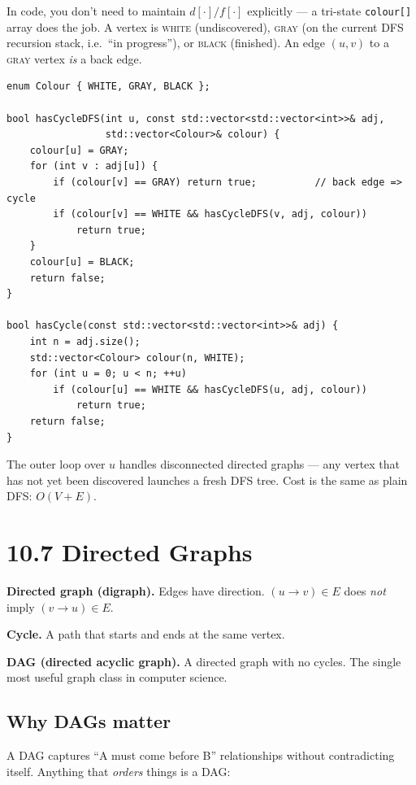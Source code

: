 \documentclass[11pt]{article}
\begin{document}
In code, you don't need to maintain $d[\cdot] / f[\cdot]$
explicitly --- a tri-state \texttt{colour[]} array does the job.
A vertex is \textsc{white} (undiscovered), \textsc{gray} (on the
current DFS recursion stack, i.e.\ ``in progress''), or
\textsc{black} (finished). An edge $(u, v)$ to a \textsc{gray}
vertex \emph{is} a back edge.

\begin{lstlisting}[basicstyle=\ttfamily\small,frame=single]
enum Colour { WHITE, GRAY, BLACK };

bool hasCycleDFS(int u, const std::vector<std::vector<int>>& adj,
                 std::vector<Colour>& colour) {
    colour[u] = GRAY;
    for (int v : adj[u]) {
        if (colour[v] == GRAY) return true;          // back edge => cycle
        if (colour[v] == WHITE && hasCycleDFS(v, adj, colour))
            return true;
    }
    colour[u] = BLACK;
    return false;
}

bool hasCycle(const std::vector<std::vector<int>>& adj) {
    int n = adj.size();
    std::vector<Colour> colour(n, WHITE);
    for (int u = 0; u < n; ++u)
        if (colour[u] == WHITE && hasCycleDFS(u, adj, colour))
            return true;
    return false;
}
\end{lstlisting}

The outer loop over $u$ handles disconnected directed graphs ---
any vertex that has not yet been discovered launches a fresh DFS
tree. Cost is the same as plain DFS: $O(V + E)$.

\section{10.7 Directed Graphs}

\begin{defnbox}
\textbf{Directed graph (digraph).} Edges have direction. $(u \to v) \in E$ does \emph{not} imply $(v \to u) \in E$.

\textbf{Cycle.} A path that starts and ends at the same vertex.

\textbf{DAG (directed acyclic graph).} A directed graph with no cycles. The single most useful graph class in computer science.
\end{defnbox}

\subsection*{Why DAGs matter}

A DAG captures ``A must come before B'' relationships without contradicting itself. Anything that \emph{orders} things is a DAG:
\end{document}
